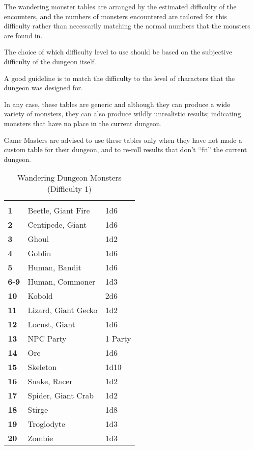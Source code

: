 \begin{multicols*}{2}
The wandering monster tables are arranged by the estimated difficulty of the encounters, and the numbers of monsters encountered are tailored for this difficulty rather than necessarily matching the normal numbers that the monsters are found in.

The choice of which difficulty level to use should be based on the subjective difficulty of the dungeon itself.

A good guideline is to match the difficulty to the level of characters that the dungeon was designed for.

In any case, these tables are generic and although they can produce a wide variety of monsters, they can also produce wildly unrealistic results; indicating monsters that have no place in the current dungeon.

Game Masters are advised to use these tables only when they have not made a custom table for their dungeon, and to re-roll results that don’t “fit” the current dungeon.

\begin {table}[H]
  \caption{Wandering Dungeon Monsters (Difficulty 1)}\label{tab:Wandering Dungeon Monsters (Difficulty 1)}
  \begin{tabularx}{\columnwidth}{>{\bfseries}YYY}
	 &  & \\
	1 & Beetle, Giant Fire & 1d6\\
	2 & Centipede, Giant & 1d6\\
	3 & Ghoul & 1d2\\
	4 & Goblin & 1d6\\
	5 & Human, Bandit & 1d6\\
	6-9 & Human, Commoner & 1d3\\
	10 & Kobold & 2d6\\
	11 & Lizard, Giant Gecko & 1d2\\
	12 & Locust, Giant & 1d6\\
	13 & NPC Party & 1 Party\\
	14 & Orc & 1d6\\
	15 & Skeleton & 1d10\\
	16 & Snake, Racer & 1d2\\
	17 & Spider, Giant Crab & 1d2\\
	18 & Stirge & 1d8\\
	19 & Troglodyte & 1d3\\
	20 & Zombie & 1d3
  \end {tabularx}
\end {table}


\end{multicols*}
